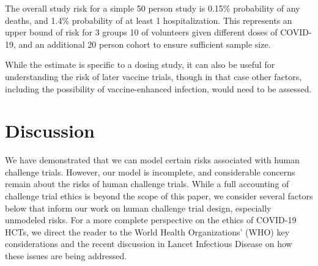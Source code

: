 \documentclass{article}
\begin{document}
The overall study risk for a simple 50 person study is 0.15\% probability of any deaths, and 1.4\% probability of at least 1 hospitalization. This represents an upper bound of risk for 3 groups 10 of volunteers given different doses of COVID-19, and an additional 20 person cohort to ensure sufficient sample size.

While the estimate is specific to a dosing study, it can also be useful for understanding the risk of later vaccine trials, though in that case other factors, including the possibility of vaccine-enhanced infection, would need to be assessed.




\section{Discussion}

We have demonstrated that we can model certain risks associated with human challenge trials. However, our model is incomplete, and considerable concerns remain about the risks of human challenge trials. While a full accounting of challenge trial ethics is beyond the scope of this paper, we consider several factors below that inform our work on human challenge trial design, especially unmodeled risks. For a more complete perspective on the ethics of COVID-19 HCTs, we direct the reader to the World Health Organizations' (WHO) key considerations \cite{world2020key} and the recent discussion in Lancet Infectious Disease \cite{jamrozik2020covid,manheim2020evolving} on how these issues are being addressed. 
\end{document}

